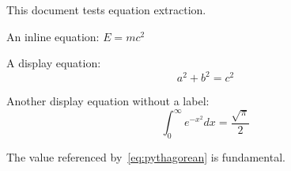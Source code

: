 \documentclass{article}
\begin{document}
This document tests equation extraction.

An inline equation: $E = mc^2$

A display equation:
\begin{equation}
\label{eq:pythagorean}
a^2 + b^2 = c^2
\end{equation}

Another display equation without a label:
\begin{equation*}
\int_{0}^{\infty} e^{-x^2} dx = \frac{\sqrt{\pi}}{2}
\end{equation*}

The value referenced by~\ref{eq:pythagorean} is fundamental.
\end{document}
